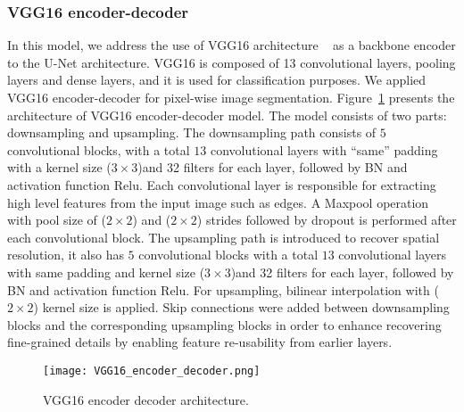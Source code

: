 \subsubsection{VGG16 encoder-decoder}
In this model, we address the use of VGG16 architecture  ~\cite{simonyan2014very} as a backbone encoder to the U-Net architecture.
VGG16 is composed of 13 convolutional layers, pooling layers and dense layers, and it is used for classification purposes. 
We applied VGG16 encoder-decoder for pixel-wise image segmentation.
Figure~\ref{vgg16} presents the architecture of VGG16 encoder-decoder model. 
The model consists of two parts: downsampling and upsampling.
The downsampling path consists of \(5\) convolutional blocks,  with a total \(13\) convolutional layers  with \enquote{same} padding with a kernel size (\(3\times3\))and 32 filters for each layer, followed by BN and activation function Relu.
Each convolutional layer is responsible for extracting high level features from the input image such as edges.
A Maxpool operation with pool size of (\(2\times2\))  and (\(2\times2\)) strides followed by dropout is performed after each convolutional block. 
The upsampling path is introduced to recover spatial resolution, it also has \(5\) convolutional blocks with a total \(13\) convolutional layers  with same padding and kernel size (\(3\times3\))and 32 filters for each layer, followed by BN and activation function Relu.
For upsampling, bilinear interpolation with (\(2\times2\)) kernel size is applied.
Skip connections were added between downsampling blocks and the corresponding upsampling blocks in order to enhance recovering fine-grained details by enabling feature re-usability from earlier layers.
\begin{figure} [h!]
	\begin{center}
		\texttt{[image: VGG16\_encoder\_decoder.png]}
	\end{center}
	\caption{VGG16 encoder decoder architecture.} 
	\label{vgg16}
\end{figure}


